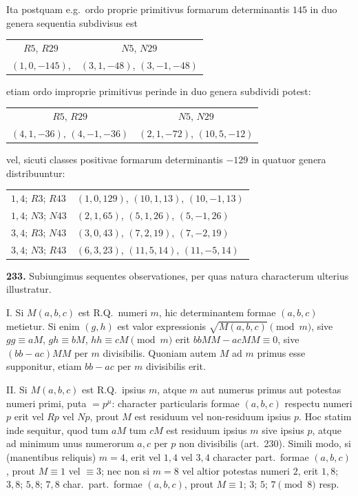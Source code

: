 \documentclass[12pt,a4paper]{article}
\theoremstyle{plain}
\theoremstyle{definition}
\theoremstyle{remark}
\begin{document}
Ita postquam e.g.\ ordo proprie primitivus formarum determinantis $145$ in duo genera sequentia subdivisus est
\begin{center}
\begin{tabular}{cc}
$R5$, $R29$ & $N5$, $N29$ \\
$(1,0,-145)$, & $(3,1,-48)$, $(3,-1,-48)$
\end{tabular}
\end{center}
etiam ordo improprie primitivus perinde in duo genera subdividi potest:
\begin{center}
\begin{tabular}{cc}
$R5$, $R29$ & $N5$, $N29$ \\
$(4,1,-36)$, $(4,-1,-36)$ & $(2,1,-72)$, $(10,5,-12)$
\end{tabular}
\end{center}
vel, sicuti classes positivae formarum determinantis $-129$ in quatuor genera distribuuntur:
\begin{center}
\begin{tabular}{ll}
$1,4$; $R3$; $R43$ & $(1,0,129)$, $(10,1,13)$, $(10,-1,13)$ \\
$1,4$; $N3$; $N43$ & $(2,1,65)$, $(5,1,26)$, $(5,-1,26)$ \\
$3,4$; $R3$; $N43$ & $(3,0,43)$, $(7,2,19)$, $(7,-2,19)$ \\
$3,4$; $N3$; $R43$ & $(6,3,23)$, $(11,5,14)$, $(11,-5,14)$
\end{tabular}
\end{center}

\textbf{233.} Subiungimus sequentes observationes, per quas natura characterum ulterius illustratur.

\textsc{I.} Si $M(a,b,c)$ est R.Q.\ numeri $m$, hic determinantem formae $(a,b,c)$ metietur. Si enim $(g,h)$ est valor expressionis $\sqrt{M(a,b,c)}\pmod{m}$, sive $gg\equiv aM$, $gh\equiv bM$, $hh\equiv cM\pmod{m}$ erit $bbMM-acMM\equiv0$, sive $(bb-ac)MM$ per $m$ divisibilis. Quoniam autem $M$ ad $m$ primus esse supponitur, etiam $bb-ac$ per $m$ divisibilis erit.

\textsc{II.} Si $M(a,b,c)$ est R.Q.\ ipsius $m$, atque $m$ aut numerus primus aut potestas numeri primi, puta $=p^\mu$: character particularis formae $(a,b,c)$ respectu numeri $p$ erit vel $Rp$ vel $Np$, prout $M$ est residuum vel non-residuum ipsius $p$. Hoc statim inde sequitur, quod tum $aM$ tum $cM$ est residuum ipsius $m$ sive ipsius $p$, atque ad minimum unus numerorum $a,c$ per $p$ non divisibilis (art.~230). Simili modo, si (manentibus reliquis) $m=4$, erit vel $1,4$ vel $3,4$ character part.\ formae $(a,b,c)$, prout $M\equiv1$ vel $\equiv3$; nec non si $m=8$ vel altior potestas numeri $2$, erit $1,8$; $3,8$; $5,8$; $7,8$ char.\ part.\ formae $(a,b,c)$, prout $M\equiv1$; $3$; $5$; $7\pmod8$ resp.
\end{document}
